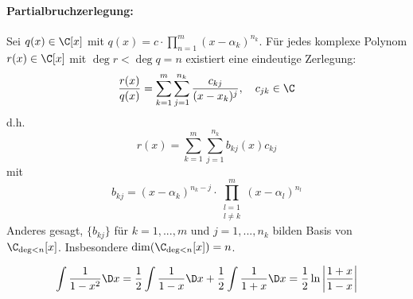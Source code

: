 \begin{example}
\paragraph{Partialbruchzerlegung:} Sei $q(x) \in \C [x]$ mit $q(x) = c \cdot \prod_{n=1}^m (x-\alpha_k)^{n_k} $. \linebreak Für jedes komplexe Polynom $r(x) \in \C[x]$ mit $\deg r < \deg q =n $ existiert eine eindeutige Zerlegung:
$$
\frac{r(x)}{q(x)} = \sum_{k=1}^m \sum_{j=1}^{n_k} \frac{c_{kj}}{(x-x_k)^j}, \quad c_{jk} \in \C
$$
d.h.
$$r(x) = \sum_{k=1}^m \sum_{j=1}^{n_k} b_{kj}(x) c_{kj}$$
mit 
$$b_{kj} = (x-\alpha_k)^{n_k-j} \cdot \prod_{\substack{l=1 \\ l \neq k}}^m (x-\alpha_l)^{n_l}$$
Anderes gesagt, $\{b_{kj}\}$ für $k=1,...,m$ und $j=1,...,n_k$ bilden Basis von $\C_{\deg<n}[x]$. Insbesondere $\dim( \C_{\deg <n}[x])=n$.

\begin{example}
$$\int \frac{1}{1-x^2} \D x = \frac{1}{2} \int \frac{1}{1-x} \D x + \frac{1}{2} \int \frac{1}{1+x} \D x = \frac{1}{2} \ln \left| \frac{1+x}{1-x} \right|$$
\end{example}
\end{example}

